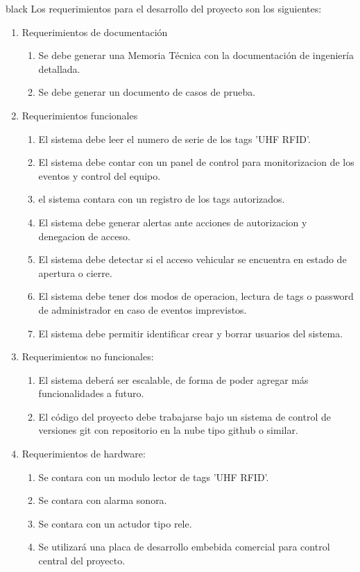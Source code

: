 \documentclass[
11pt, %
codirector, %
]{charter}
\begin{document}
\begin{consigna}{black}
Los requerimientos para el desarrollo del proyecto son los siguientes:
\begin{enumerate}
	\item Requerimientos de documentación
		\begin{enumerate}
			\item Se debe generar una Memoria Técnica con la documentación de ingeniería detallada.
			\item Se debe generar un documento de casos de prueba.
		\end{enumerate}
	\item Requerimientos funcionales
		\begin{enumerate}
		\item El sistema debe leer el numero de serie de los tags 'UHF RFID'.
		\item El sistema debe contar con un panel de control para monitorizacion de los eventos y control del equipo.
		\item el sistema contara con un registro de los tags autorizados.
		\item El sistema debe generar alertas ante acciones de autorizacion y denegacion de acceso.
		\item El sistema debe detectar si el acceso vehicular se encuentra en estado de apertura o cierre.
		\item El sistema debe tener dos modos de operacion, lectura de tags o password de administrador en caso de eventos imprevistos.
		\item El sistema debe permitir identificar crear y borrar usuarios
del sistema.
		\end{enumerate}
	\item Requerimientos no funcionales:
		\begin{enumerate}
		\item El sistema deberá ser escalable, de forma de poder agregar más funcionalidades a futuro.
		\item  El código del proyecto debe trabajarse bajo un sistema de control de versiones git con repositorio en la nube tipo github o similar.
		    \end{enumerate}
	\item Requerimientos de hardware:
		\begin{enumerate}
		\item Se contara con un modulo lector de tags 'UHF RFID'.
		\item Se contara con alarma sonora.
		\item Se contara con un actudor tipo rele.
		\item Se utilizará una placa de desarrollo embebida comercial para control central del proyecto.
		    \end{enumerate}
		\begin{enumerate}
		\end{enumerate}
\end{enumerate}
\end{consigna}
\end{document}
